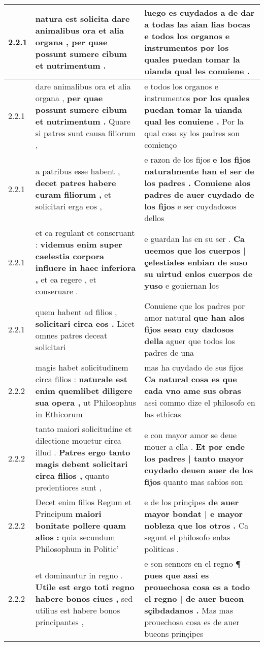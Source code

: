 \begin{tabular}{|p{1cm}|p{6.5cm}|p{6.5cm}|}
2.2.1 & natura est solicita \textbf{ dare animalibus ora et alia organa , } per quae possunt sumere cibum et nutrimentum . & luego es cuydados a de dar a todas las aian lias bocas \textbf{ e todos los organos e instrumentos } por los quales puedan tomar la uianda qual les conuiene . \\\hline
2.2.1 & dare animalibus ora et alia organa , \textbf{ per quae possunt sumere cibum et nutrimentum . } Quare si patres sunt causa filiorum , & e todos los organos e instrumentos \textbf{ por los quales puedan tomar la uianda qual les conuiene . } Por la qual cosa sy los padres son comienço \\\hline
2.2.1 & a patribus esse habent , \textbf{ decet patres habere curam filiorum , } et solicitari erga eos , & e razon de los fijos \textbf{ e los fijos naturalmente han el ser de los padres . Conuiene alos padres de auer cuydado de los fijos } e ser cuydadosos dellos \\\hline
2.2.1 & et ea regulant et conseruant : \textbf{ videmus enim super caelestia corpora influere in haec inferiora , } et ea regere , et conseruare . & e guardan las en su ser . \textbf{ Ca ueemos que los cuerpos | çelestiales enbian de suso su uirtud enlos cuerpos de yuso } e gouiernan los \\\hline
2.2.1 & quem habent ad filios , \textbf{ solicitari circa eos . } Licet omnes patres deceat solicitari & Conuiene que los padres por amor natural \textbf{ que han alos fijos sean cuy dadosos della } aguer que todos los padres de una \\\hline
2.2.2 & magis habet solicitudinem circa filios : \textbf{ naturale est enim quemlibet diligere sua opera , } ut Philosophus in Ethicorum & mas ha cuydado de sus fijos \textbf{ Ca natural cosa es que cada vno ame sus obras } assi commo dize el philosofo en las ethicas \\\hline
2.2.2 & tanto maiori solicitudine et dilectione mouetur circa illud . \textbf{ Patres ergo tanto magis debent solicitari circa filios , } quanto predentiores sunt , & e con mayor amor se deue mouer a ella . \textbf{ Et por ende los padres | tanto mayor cuydado deuen auer de los fijos } quanto mas sabios son \\\hline
2.2.2 & Decet enim filios Regum et Principum \textbf{ maiori bonitate pollere quam alios : } quia secundum Philosophum in Politic’ & e de los prinçipes \textbf{ de auer mayor bondat | e mayor nobleza que los otros . } Ca segunt el philosofo enlas politicas . \\\hline
2.2.2 & et dominantur in regno . \textbf{ Utile est ergo toti regno habere bonos ciues , } sed utilius est habere bonos principantes , & e son sennors en el regno ¶ \textbf{ pues que assi es prouechosa cosa es a todo el regno | de auer bueon sçibdadanos . } Mas mas prouechosa cosa es de auer bueons prinçipes \\\hline

\end{tabular}
